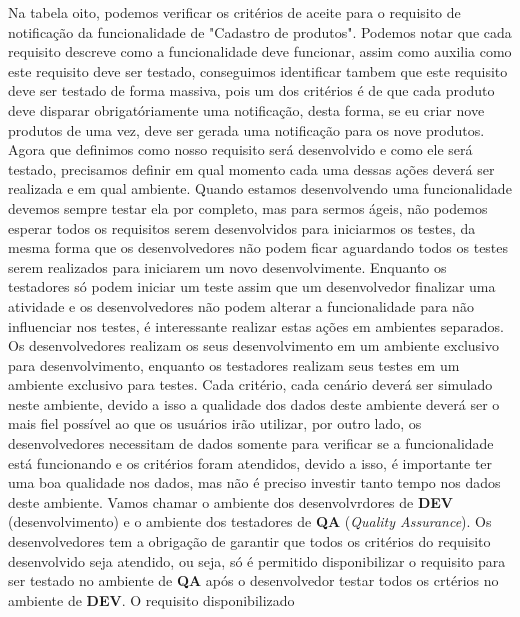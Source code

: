     Na tabela oito, podemos verificar os critérios de aceite para o requisito de
    notificação da funcionalidade de "Cadastro de produtos". Podemos notar que cada
    requisito descreve como a funcionalidade deve funcionar, assim como auxilia
    como este requisito deve ser testado, conseguimos identificar tambem que este
    requisito deve ser testado de forma massiva, pois um dos critérios é de que
    cada produto deve disparar obrigatóriamente uma notificação, desta forma, se
    eu criar nove produtos de uma vez, deve ser gerada uma notificação para os
    nove produtos. \newline
    Agora que definimos como nosso requisito será desenvolvido e como ele será
    testado, precisamos definir em qual momento cada uma dessas ações deverá ser
    realizada e em qual ambiente. Quando estamos desenvolvendo uma funcionalidade
    devemos sempre testar ela por completo, mas para sermos ágeis, não podemos
    esperar todos os requisitos serem desenvolvidos para iniciarmos os testes,
    da mesma forma que os desenvolvedores não podem ficar aguardando todos os
    testes serem realizados para iniciarem um novo desenvolvimente. Enquanto os
    testadores só podem iniciar um teste assim que um desenvolvedor finalizar
    uma atividade e os desenvolvedores não podem alterar a funcionalidade para não
    influenciar nos testes, é interessante realizar estas ações em ambientes
    separados. Os desenvolvedores realizam os seus desenvolvimento em um ambiente
    exclusivo para desenvolvimento, enquanto os testadores realizam seus testes
    em um ambiente exclusivo para testes. Cada critério, cada cenário deverá ser
    simulado neste ambiente, devido a isso a qualidade dos dados deste ambiente
    deverá ser o mais fiel possível ao que os usuários irão utilizar, por outro
    lado, os desenvolvedores necessitam de dados somente para verificar se a
    funcionalidade está funcionando e os critérios foram atendidos, devido a isso,
    é importante ter uma boa qualidade nos dados, mas não é preciso investir
    tanto tempo nos dados deste ambiente. Vamos chamar o ambiente dos desenvolvrdores
    de \textbf{DEV} (desenvolvimento) e o ambiente dos testadores de \textbf{QA}
    (\textit{Quality Assurance}). \newline
    Os desenvolvedores tem a obrigação de garantir que todos os critérios do
    requisito desenvolvido seja atendido, ou seja, só é permitido disponibilizar
    o requisito para ser testado no ambiente de \textbf{QA} após o desenvolvedor
    testar todos os crtérios no ambiente de \textbf{DEV}. O requisito disponibilizado
